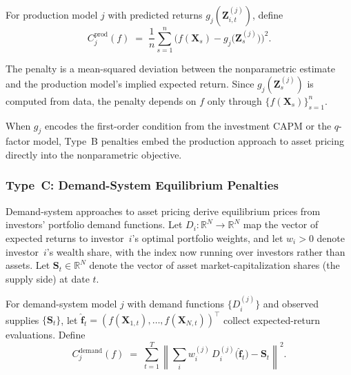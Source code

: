 \begin{definition}
\label{def:prod_penalty}
For production model $j$ with predicted returns $g_j(\mathbf{Z}_{i,t}^{(j)})$, define
\begin{equation}
\label{eq:prod_penalty}
C_j^{\mathrm{prod}}(f) \;=\;
\frac{1}{n}\sum_{s=1}^{n}
\bigl(
f(\mathbf{X}_s) - g_j\bigl(\mathbf{Z}_s^{(j)}\bigr)
\bigr)^2.
\end{equation}
\end{definition}

\noindent
The penalty is a mean-squared deviation between the nonparametric estimate
and the production model's implied expected return.
Since $g_j(\mathbf{Z}_s^{(j)})$ is computed from data, the penalty depends on $f$
only through $\{f(\mathbf{X}_s)\}_{s=1}^n$.

\begin{remark}
When $g_j$ encodes the first-order condition from the investment CAPM
or the $q$-factor model,
Type~B penalties embed the production approach
to asset pricing directly into the nonparametric objective.
\end{remark}

\subsubsection{Type~C: Demand-System Equilibrium Penalties}
\label{sub:demand}

Demand-system approaches to asset pricing derive equilibrium prices
from investors' portfolio demand functions.
Let $D_i: \mathbb{R}^N \to \mathbb{R}^N$ map the vector of expected returns to investor~$i$'s
optimal portfolio weights, and let $w_i > 0$ denote
investor~$i$'s wealth share, with the index now running over investors
rather than assets.
Let $\mathbf{S}_t \in \mathbb{R}^N$ denote the vector of asset market-capitalization
shares (the supply side) at date $t$.

\begin{definition}
\label{def:demand_penalty}
For demand-system model $j$ with demand functions
$\{D_i^{(j)}\}$ and observed supplies $\{\mathbf{S}_t\}$, let
$\hat{\mathbf{f}}_t = (f(\mathbf{X}_{1,t}), \ldots, f(\mathbf{X}_{N,t}))^\top$
collect expected-return evaluations.  Define
\begin{equation}
\label{eq:demand_penalty}
C_j^{\mathrm{demand}}(f) \;=\;
\sum_{t=1}^{T}
\left\|
\sum_{i} w_i^{(j)}\, D_i^{(j)}\bigl(\hat{\mathbf{f}}_t\bigr) - \mathbf{S}_t
\right\|^2.
\end{equation}
\end{definition}

